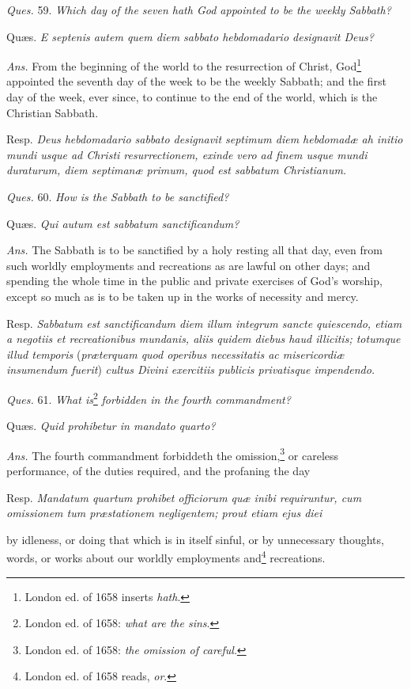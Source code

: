 \emph{Ques.} 59. \emph{Which day of the seven hath God appointed to be the weekly Sabbath?}

Quæs. \emph{E septenis autem quem diem sabbato hebdomadario designavit Deus?}

\emph{Ans.} From the beginning of the world to the resurrection of Christ, God\footnote{London ed. of 1658 inserts \emph{hath}.} appointed the seventh day of the week to be the weekly Sabbath; and the first day of the week, ever since, to continue to the end of the world, which is the Christian Sabbath.

Resp. \emph{Deus hebdomadario sabbato designavit septimum diem hebdomadæ ah initio mundi usque ad Christi resurrectionem, exinde vero ad finem usque mundi duraturum, diem septimanæ primum, quod est sabbatum Christianum.}

\emph{Ques.} 60. \emph{How is the Sabbath to be sanctified?}

Quæs. \emph{Qui autum est sabbatum sanctificandum?}

\emph{Ans.} The Sabbath is to be sanctified by a holy resting all that day, even from such worldly employments and recreations as are lawful on other days; and spending the whole time in the public and private exercises of God's worship, except so much as is to be taken up in the works of necessity and mercy.

Resp. \emph{Sabbatum est sanctificandum diem illum integrum sancte quiescendo, etiam a negotiis et recreationibus mundanis, aliis quidem diebus haud illicitis; totumque illud temporis} (\emph{præterquam quod operibus necessitatis ac misericordiæ insumendum fuerit}) \emph{cultus Divini exercitiis publicis privatisque impendendo.}

\emph{Ques.} 61. \emph{What is}\footnote{London ed. of 1658: \emph{what are the sins}.} \emph{forbidden in the fourth commandment?}

Quæs. \emph{Quid prohibetur in mandato quarto?}

\emph{Ans.} The fourth commandment forbiddeth the omission,\footnote{London ed. of 1658: \emph{the omission of careful}.} or careless performance, of the duties required, and the profaning the day

Resp. \emph{Mandatum quartum prohibet officiorum quæ inibi requiruntur, cum omissionem tum præstationem negligentem; prout etiam ejus diei }

by idleness, or doing that which is in itself sinful, or by unnecessary thoughts, words, or works about our worldly employments and\footnote{London ed. of 1658 reads, \emph{or}.} recreations.

